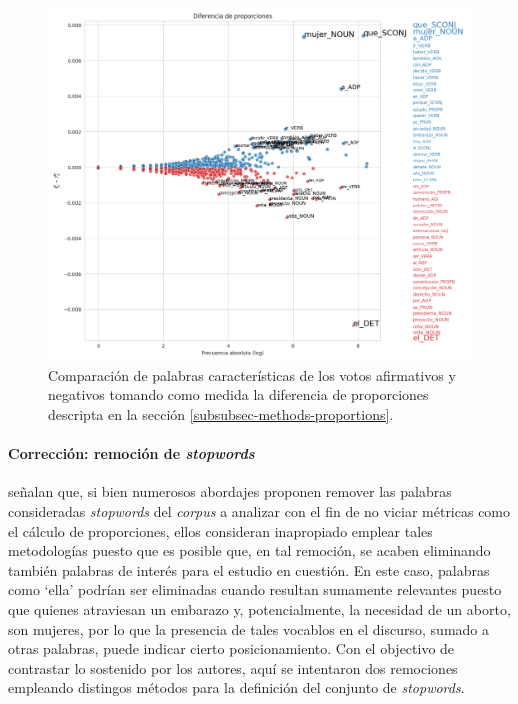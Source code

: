 \begin{figure}[h!]
    \centering
    \includegraphics[scale=0.4]{./images/graphs/proporciones.png}
    \caption{Comparaci\'on de palabras caracter\'isticas de los votos afirmativos y
    negativos tomando como medida la diferencia de proporciones descripta
    en la secci\'on \ref{subsubsec-methods-proportions}.}
    \label{fig-statistics-proportions}
\end{figure}

\paragraph{Correcci\'on: remoci\'on de \textit{stopwords}}
\cite{monroe2008fightin} señalan que, si bien numerosos abordajes proponen remover
las palabras consideradas \textit{stopwords} del \textit{corpus} a analizar con el
fin de no viciar m\'etricas como el c\'alculo de proporciones, ellos consideran inapropiado
emplear tales metodolog\'ias puesto que es posible que, en tal remoci\'on, se acaben
eliminando tambi\'en palabras de inter\'es para el estudio en cuesti\'on. En este caso,
palabras como `ella' podr\'ian ser eliminadas cuando resultan sumamente relevantes
puesto que quienes atraviesan un embarazo y, potencialmente, la necesidad de un
aborto, son mujeres, por lo que la presencia de tales vocablos en el discurso, sumado
a otras palabras, puede indicar cierto posicionamiento. Con el objectivo de
contrastar lo sostenido por los autores, aqu\'i se intentaron dos remociones empleando
distingos m\'etodos para la definici\'on del conjunto de \textit{stopwords}.

